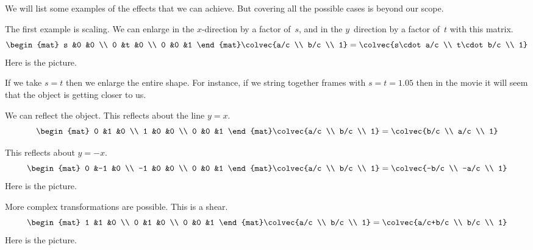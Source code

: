 We will list some examples of the effects that we can achieve.
But covering all the possible cases is beyond our scope.

The first example is scaling.
We can enlarge in the $x$-direction by a factor of~$s$, and in the
$y$~direction by a factor of~$t$ with this matrix.
\begin{equation*}
  \begin{mat}
    s  &0  &0  \\
    0  &t  &0  \\
    0  &0  &1  
  \end{mat}
  \colvec{a/c \\ b/c \\ 1}
  =
  \colvec{s\cdot a/c  \\  
          t\cdot b/c \\ 
          1}
\end{equation*}
Here is the picture.

If we take $s=t$ then we enlarge the entire shape.
For instance, if we string together frames with $s=t=1.05$ then in
the movie it will seem that the object is getting closer to us.

We can reflect the object.
This reflects about the line $y=x$.
\begin{equation*}
  \begin{mat}
    0  &1  &0  \\
    1  &0  &0  \\
    0  &0  &1  
  \end{mat}
  \colvec{a/c \\ b/c \\ 1}
  =
  \colvec{b/c  \\  
          a/c \\ 
          1}
\end{equation*}

This reflects about $y=-x$.
\begin{equation*}
  \begin{mat}
    0   &-1  &0  \\
    -1  &0  &0  \\
    0   &0  &1  
  \end{mat}
  \colvec{a/c \\ b/c \\ 1}
  =
  \colvec{-b/c  \\  
          -a/c \\ 
          1}
\end{equation*}
Here is the picture.

More complex transformations are possible.
This is a shear.
\begin{equation*}
  \begin{mat}
    1   &1  &0  \\
    0   &1  &0  \\
    0   &0  &1  
  \end{mat}
  \colvec{a/c \\ b/c \\ 1}
  =
  \colvec{a/c+b/c  \\  
          b/c \\ 
          1}
\end{equation*}
Here is the picture.


